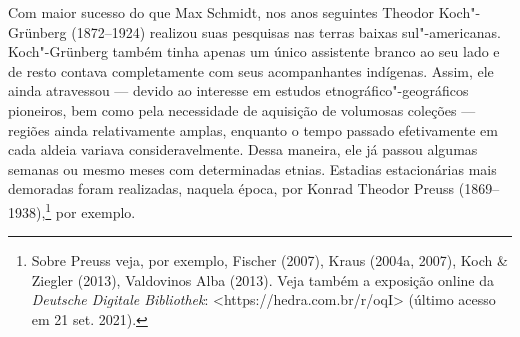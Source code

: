 Com maior sucesso do que Max Schmidt, nos anos seguintes Theodor
Koch"-Grünberg (1872--1924) realizou suas pesquisas nas terras baixas
sul"-americanas. Koch"-Grünberg também tinha apenas um único assistente
branco ao seu lado e de resto contava completamente com seus
acompanhantes indígenas. Assim, ele ainda atravessou --- devido ao
interesse em estudos etnográfico"-geográficos pioneiros, bem como pela
necessidade de aquisição de volumosas coleções --- regiões ainda
relativamente amplas, enquanto o tempo passado efetivamente em cada
aldeia variava consideravelmente. Dessa maneira, ele já passou algumas
semanas ou mesmo meses com determinadas etnias. Estadias estacionárias
mais demoradas foram realizadas, naquela época, por Konrad Theodor
Preuss (1869--1938),\footnote{Sobre Preuss veja, por exemplo, Fischer
  (2007), Kraus (2004a, 2007), Koch \& Ziegler (2013), Valdovinos Alba
  (2013). Veja também a exposição online da \textit{Deutsche Digitale
  Bibliothek}:
  \textless{}https://hedra.com.br/r/oqI\textgreater{} 
  (último acesso em 21 set. 2021).} por exemplo.

